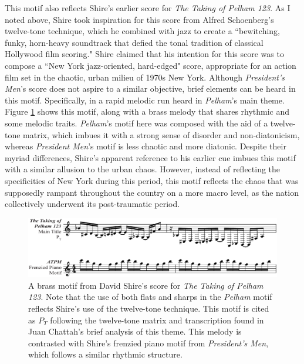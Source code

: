 This motif also reflects Shire's earlier score for \textit{The Taking of Pelham 123}.
As I noted above, Shire took inspiration for this score from Alfred Schoenberg's twelve-tone technique, which he combined with jazz to create a ``bewitching, funky, horn-heavy soundtrack that defied the tonal tradition of classical Hollywood film scoring."\autocites[][30]{chattah_david_2015}
Shire claimed that his intention for this score was to compose a ``New York jazz-oriented, hard-edged" score, appropriate for an action film set in the chaotic, urban milieu of 1970s New York.\autocites[][30]{chattah_david_2015}
Although \textit{President's Men}'s score does not aspire to a similar objective, brief elements can be heard in this motif.
Specifically, in a rapid melodic run heard in \textit{Pelham}'s main theme.
Figure \ref{fig:president-pelham} shows this motif, along with a brass melody that shares rhythmic and some melodic traits.
\textit{Pelham}'s motif here was composed with the aid of a twelve-tone matrix, which imbues it with a strong sense of disorder and non-diatonicism, whereas \textit{President Men}'s motif is less chaotic and more diatonic.
Despite their myriad differences, Shire's apparent reference to his earlier cue imbues this motif with a similar allusion to the urban chaos.
However, instead of reflecting the specificities of New York during this period, this motif reflects the chaos that was supposedly rampant throughout the country on a more macro level, as the nation collectively underwent its post-traumatic period.

\begin{figure}
    \centering
    \includegraphics[width=1\linewidth]{img/president-pelham.pdf}
    \caption{A brass motif from David Shire's score for \textit{The Taking of Pelham 123}. Note that the use of both flats and sharps in the \textit{Pelham} motif reflects Shire's use of the twelve-tone technique. This motif is cited as $P_T$ following the twelve-tone matrix and transcription found in Juan Chattah's brief analysis of this theme.\autocites[][31-32]{chattah_david_2015} This melody is contrasted with Shire's frenzied piano motif from \textit{President's Men}, which follows a similar rhythmic structure.}
    \label{fig:president-pelham}
\end{figure}

